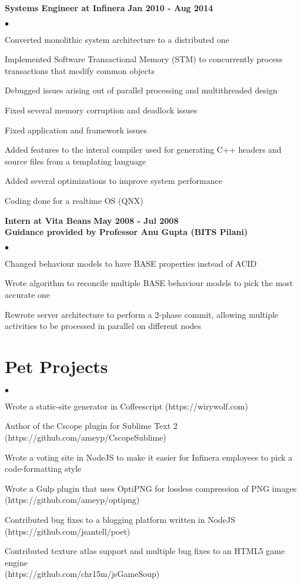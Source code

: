 \documentclass[margin,line]{res}
\newenvironment{list2}{
  \begin{list}{$\bullet$}{%
      \setlength{\itemsep}{0in}
      \setlength{\parsep}{0in} \setlength{\parskip}{0in}
      \setlength{\topsep}{0in} \setlength{\partopsep}{0in}
      \setlength{\leftmargin}{0.2in}}}{\end{list}}
\begin{document}
\begin{resume}
{\bf Systems Engineer at Infinera} \hfill {\bf Jan 2010 - Aug 2014}\\
\begin{list2}
\item Converted monolithic system architecture to a distributed one
\item Implemented Software Transactional Memory (STM) to concurrently process transactions that modify common objects
\item Debugged issues arising out of parallel processing and multithreaded design
\item Fixed several memory corruption and deadlock issues
\item Fixed application and framework issues
\item Added features to the interal compiler used for generating C++ headers and source files from a templating language
\item Added several optimizations to improve system performance
\item Coding done for a realtime OS (QNX)
\end{list2}

{\bf Intern at Vita Beans} \hfill {\bf May 2008 - Jul 2008} \\
{\bf Guidance provided by Professor Anu Gupta (BITS Pilani)}
\vspace*{.05in}
\begin{list2}
\item Changed behaviour models to have BASE properties instead of ACID
\item Wrote algorithm to reconcile multiple BASE behaviour models to pick the most accurate one
\item Rewrote server architecture to perform a 2-phase commit, allowing multiple activities to be processed in parallel on different nodes
\end{list2}

\section{\sc Pet Projects}
\begin{list2}
  \item Wrote a static-site generator in Coffeescript (https://wirywolf.com)
  \item Author of the Cscope plugin for Sublime Text 2 (https://github.com/ameyp/CscopeSublime)
  \item Wrote a voting site in NodeJS to make it easier for Infinera employees to pick a code-formatting style
  \item Wrote a Gulp plugin that uses OptiPNG for lossless compression of PNG images \\ (https://github.com/ameyp/optipng)
  \item Contributed bug fixes to a blogging platform written in NodeJS \- (https://github.com/jsantell/poet)
  \item Contributed texture atlas support and multiple bug fixes to an HTML5 game engine \\ (https://github.com/chr15m/jsGameSoup)
\end{list2}


\end{resume}
\end{document}
